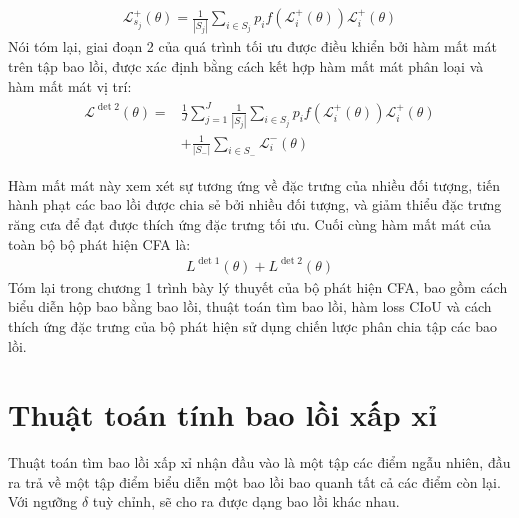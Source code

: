 \documentclass[12pt,a4paper,openany,oneside]{report}
\begin{document}
\begin{align}\label{loss_update}
	\mathcal{L}_{s_j}^{+}(\theta)=\frac{1}{\left|S_j\right|} \sum_{i \in S_j} p_i f\left(\mathcal{L}_i^{+}(\theta)\right) \mathcal{L}_i^{+}(\theta)
\end{align}
Nói tóm lại, giai đoạn 2 của quá trình tối ưu được điều khiển bởi hàm mất mát trên tập bao lồi, được xác định bằng cách kết hợp hàm mất mát phân loại và hàm mất mát vị trí:
\begin{align} \label{loss_det_2}
	\begin{aligned}
		\mathcal{L}^{\operatorname{det} 2}(\theta)= & \frac{1}{J} \sum_{j=1}^J \frac{1}{\left|S_j\right|} \sum_{i \in S_j} p_i f\left(\mathcal{L}_i^{+}(\theta)\right) \mathcal{L}_i^{+}(\theta) \\
		& +\frac{1}{\left|S_{-}\right|} \sum_{i \in S_{-}} \mathcal{L}_i^{-}(\theta)
	\end{aligned}
\end{align}

Hàm mất mát này xem xét sự tương ứng về đặc trưng của nhiều đối tượng, tiến hành phạt các bao lồi được chia sẻ bởi nhiều đối tượng, và giảm thiểu đặc trưng răng cưa để đạt được thích ứng đặc trưng tối ưu. Cuối cùng hàm mất mát của toàn bộ bộ phát hiện CFA là: 
\begin{align} \label{final_loss_CFA}
	L^{\operatorname{det} 1}(\theta)+L^{\operatorname{det} 2}(\theta)
\end{align}
Tóm lại trong chương 1 trình bày lý thuyết của bộ phát hiện CFA, bao gồm cách biểu diễn hộp bao bằng bao lồi, thuật toán tìm bao lồi, hàm loss CIoU và cách thích ứng đặc trưng của bộ phát hiện sử dụng chiến lược phân chia tập các bao lồi.
\chapter{Thuật toán tính bao lồi xấp xỉ}
Thuật toán tìm bao lồi xấp xỉ nhận đầu vào là một tập các điểm ngẫu nhiên, đầu ra trả về một tập điểm biểu diễn một bao lồi bao quanh tất cả các điểm còn lại. Với ngưỡng $\delta$ tuỳ chỉnh, sẽ cho ra được dạng bao lồi khác nhau.
\end{document}
